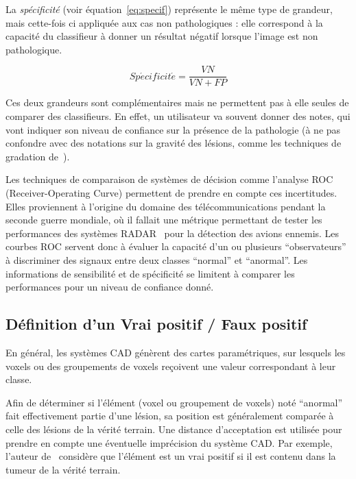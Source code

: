 La \emph{spécificité} (voir équation~\ref{eq:specif}) représente le même type de grandeur, mais cette-fois ci appliquée aux cas non pathologiques : elle correspond à la capacité du classifieur à donner un résultat négatif lorsque l'image est non pathologique.

\begin{equation}
	\label{eq:specif}
	Sp\acute{e}cificit\acute{e} = \frac{VN}{VN + FP}
\end{equation}

Ces deux grandeurs sont complémentaires mais ne permettent pas à elle seules de comparer des classifieurs. En effet, un  utilisateur va souvent donner des notes, qui vont indiquer son niveau de confiance sur la présence de la pathologie (à ne pas confondre avec des notations sur la gravité des lésions, comme les techniques de gradation de~\cite{genestie1998comparison}).

Les techniques de comparaison de systèmes de décision comme l'analyse ROC (Receiver-Operating Curve) permettent de prendre en compte ces incertitudes. Elles proviennent à l'origine du domaine des télécommunications pendant la seconde guerre mondiale, où il fallait une métrique permettant de tester les performances des systèmes RADAR~\cite{zou2007receiver} pour la détection des avions ennemis. Les courbes ROC servent donc à évaluer la capacité d'un ou plusieurs ``observateurs'' à discriminer des signaux entre deux classes ``normal'' et ``anormal''. Les informations de sensibilité et de spécificité se limitent à comparer les performances pour un niveau de confiance donné.

\subsection{Définition d'un Vrai positif / Faux positif}

En général, les systèmes CAD génèrent des cartes paramétriques, sur lesquels les voxels ou des groupements de voxels reçoivent une valeur correspondant à leur classe. 

Afin de déterminer si l'élément (voxel ou groupement de voxels) noté ``anormal'' fait effectivement partie d'une lésion, sa  position est généralement comparée à celle des lésions de la vérité terrain. Une distance d'acceptation est utilisée pour prendre en compte une éventuelle imprécision du système CAD. Par exemple, l'auteur de~\cite{paik2004surface} considère que l'élément est un vrai positif si il est contenu dans la tumeur de la vérité terrain.

